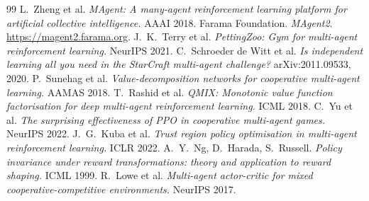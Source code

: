 \documentclass[11pt,a4paper]{article}
\begin{document}
\begin{thebibliography}{99}\small
{} L.~Zheng et al. \emph{MAgent: A many-agent reinforcement learning platform
for artificial collective intelligence.} AAAI 2018.
 Farama Foundation. \emph{MAgent2}. \url{https://magent2.farama.org}.
 J.~K.~Terry et al. \emph{PettingZoo: Gym for multi-agent reinforcement
learning.} NeurIPS 2021.
 C.~Schroeder de Witt et al. \emph{Is independent learning all you need in the
StarCraft multi-agent challenge?} arXiv:2011.09533, 2020.
 P.~Sunehag et al. \emph{Value-decomposition networks for cooperative
multi-agent learning.} AAMAS 2018.
 T.~Rashid et al. \emph{QMIX: Monotonic value function factorisation for deep
multi-agent reinforcement learning.} ICML 2018.
 C.~Yu et al. \emph{The surprising effectiveness of PPO in cooperative
multi-agent games.} NeurIPS 2022.
 J.~G.~Kuba et al. \emph{Trust region policy optimisation in multi-agent
reinforcement learning.} ICLR 2022.
 A.~Y.~Ng, D.~Harada, S.~Russell. \emph{Policy invariance under reward
transformations: theory and application to reward shaping.} ICML 1999.
 R.~Lowe et al. \emph{Multi-agent actor-critic for mixed
cooperative-competitive environments.} NeurIPS 2017.
\end{thebibliography}
\end{document}
